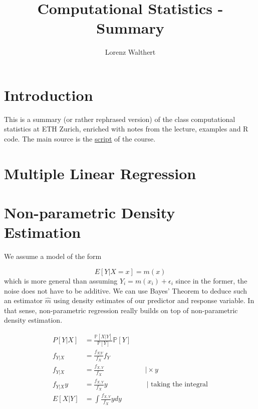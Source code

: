 \documentclass[]{book}
\title{Computational Statistics - Summary}
\author{Lorenz Walthert}
\date{}
\begin{document}
\maketitle

{
\setcounter{tocdepth}{1}
\tableofcontents
}
\chapter{Introduction}\label{introduction}

This is a summary (or rather rephrased version) of the class
computational statistics at ETH Zurich, enriched with notes from the
lecture, examples and R code. The main source is the
\href{https://polybox.ethz.ch/index.php/s/q3NaRdR7K6Xrfkd/download}{script}
of the course.

\chapter{Multiple Linear Regression}\label{multiple-linear-regression}

\chapter{Non-parametric Density
Estimation}\label{non-parametric-density-estimation}

We assume a model of the form

\[ E[Y|X = x] = m(x)\] which is more general than assuming
\(Y_i = m(x_i) + \epsilon_i\) since in the former, the noise does not
have to be additive. We can use Bayes' Theorem to deduce such an
estimator \(\hat{m}\) using density estimates of our predictor and
response variable. In that sense, non-parametric regression really
builds on top of non-parametric density estimation.

\begin{equation}
\begin{split}
P[Y|X] &=  \frac{\mathbb{P}[X|Y]}{\mathbb{P}[Y]}\mathbb{P}[Y] \\ 
f_{Y|X} & = \frac{f_{X|Y}}{f_X}f_Y \\
f_{Y|X} & = \frac{f_{X, Y}}{f_X}   \;\;\;\;\;\;\;\;\;\;\;\;\;\;\;\;\;\;\;\;\; \text{|} \times y\\
f_{Y|X}y & = \frac{f_{X, Y}}{f_X}y \;\;\;\;\;\;\;\;\;\;\;\;\;\;\;\;\;\;\;\; \text{| taking the integral}\\
E[X|Y] & = \int \frac{f_{X, Y}}{f_X}ydy
\end{split}
\end{equation}
\end{document}
